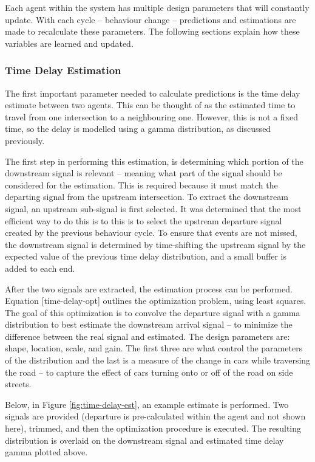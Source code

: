 \documentclass{report}
\begin{document}
Each agent within the system has multiple design parameters that will constantly update. With each cycle -- behaviour change -- predictions and estimations are made to recalculate these parameters. 
The following sections explain how these variables are learned and updated.

\subsubsection{Time Delay Estimation}
The first important parameter needed to calculate predictions is the time delay estimate between two agents. 
This can be thought of as the estimated time to travel from one intersection to a neighbouring one. 
However, this is not a fixed time, so the delay is modelled using a gamma distribution, as discussed previously. 

The first step in performing this estimation, is determining which portion of the downstream signal is relevant – meaning what part of the signal should be considered for the estimation. 
This is required because it must match the departing signal from the upstream intersection. 
To extract the downstream signal, an upstream sub-signal is first selected. It was determined that the most efficient way to do this is to this is to select the upstream departure signal created by the previous behaviour cycle. 
To ensure that events are not missed, the downstream signal is determined by time-shifting the upstream signal by the expected value of the previous time delay distribution, and a small buffer is added to each end.

After the two signals are extracted, the estimation process can be performed. 
Equation [time-delay-opt] outlines the optimization problem, using least squares. 
The goal of this optimization is to convolve the departure signal with a gamma distribution to best estimate the downstream arrival signal -- to minimize the difference between the real signal and estimated. 
The design parameters are: shape, location, scale, and gain. 
The first three are what control the parameters of the distribution and the last is a measure of the change in cars while traversing the road -- to capture the effect of cars turning onto or off of the road on side streets.

Below, in Figure \ref{fig:time-delay-est}, an example estimate is performed. 
Two signals are provided (departure is pre-calculated within the agent and not shown here), trimmed, and then the optimization procedure is executed. 
The resulting distribution is overlaid on the downstream signal and estimated time delay gamma plotted above.
\end{document}
